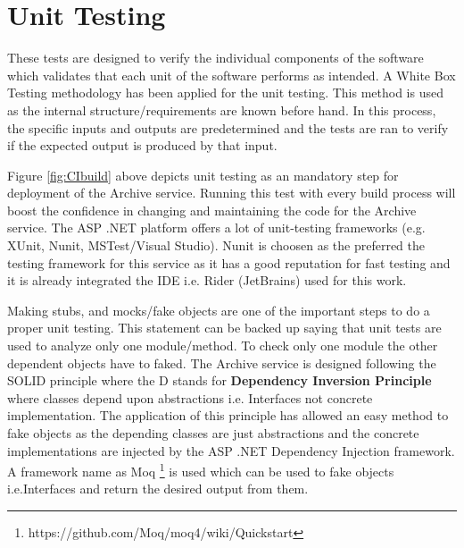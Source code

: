 \section{Unit Testing}
These tests are designed to verify the individual components of the software which validates that each unit of the software performs as intended. A White Box
Testing methodology has been applied for the unit testing. This method is used as the internal structure/requirements are known before hand. In this process,
the specific inputs and outputs are predetermined and the tests are ran to verify if the expected output is produced by that input. 

\par
Figure \ref{fig:CIbuild} above depicts
unit testing as an mandatory step for deployment of the Archive service. Running this test with every build process will boost the confidence 
in changing and maintaining the code for the Archive service. The ASP .NET platform offers a lot of unit-testing frameworks 
(e.g. XUnit, Nunit, MSTest/Visual Studio). Nunit is choosen as the preferred the testing framework for this service as it has a good reputation for
fast testing and it is already integrated the IDE i.e. Rider (JetBrains) used for this work. 

\par
Making stubs, and mocks/fake objects are one of the important steps to do a proper unit testing. This statement can be backed up saying that unit tests are
used to analyze only one module/method. To check only one module the other dependent objects have to faked. The Archive service is designed following the
SOLID \cite{Hotop2015} principle where the D stands for \textbf{Dependency Inversion Principle} where classes depend upon abstractions i.e. Interfaces not concrete
implementation. The application of this principle has allowed an easy method to fake objects as the depending classes are just abstractions and the concrete 
implementations are injected by the ASP .NET Dependency Injection framework. A framework name as Moq \footnote{https://github.com/Moq/moq4/wiki/Quickstart} is used
which can be used to fake objects i.e.Interfaces and return the desired output from them. 

